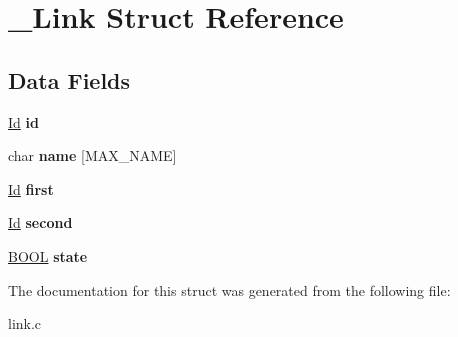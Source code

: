 \hypertarget{struct__Link}{}\section{\+\_\+\+Link Struct Reference}
\label{struct__Link}
\subsection*{Data Fields}
\begin{DoxyCompactItemize}
\item 
\mbox{\label{struct__Link_a151212e7a8e8274c2a1ee991ba95878b}} 
\hyperlink{types_8h_a845e604fb28f7e3d97549da3448149d3}{Id} {\bfseries id}
\item 
\mbox{\label{struct__Link_a4af790a3cc583bdc48eca59559f7b71c}} 
char {\bfseries name} \mbox{[}M\+A\+X\+\_\+\+N\+A\+ME\mbox{]}
\item 
\mbox{\label{struct__Link_a57a29c5dc610ac70ec7e87c450247d00}} 
\hyperlink{types_8h_a845e604fb28f7e3d97549da3448149d3}{Id} {\bfseries first}
\item 
\mbox{\label{struct__Link_a5e5237cb33540ab393dd279eb8934431}} 
\hyperlink{types_8h_a845e604fb28f7e3d97549da3448149d3}{Id} {\bfseries second}
\item 
\mbox{\label{struct__Link_a82cc94a1764a428c2eaaa6ef60fb3949}} 
\hyperlink{types_8h_a3e5b8192e7d9ffaf3542f1210aec18dd}{B\+O\+OL} {\bfseries state}
\end{DoxyCompactItemize}


The documentation for this struct was generated from the following file\+:\begin{DoxyCompactItemize}
\item 
link.\+c\end{DoxyCompactItemize}
